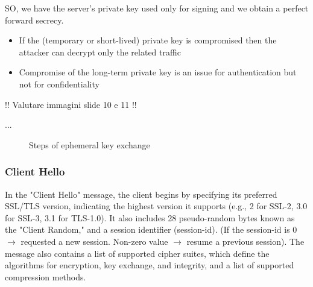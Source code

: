 SO, we have the server’s private key used only for signing and we obtain
a perfect forward secrecy. \\
\begin{itemize}[itemsep=0pt]
    \item  If the (temporary or short-lived) private key is compromised
          then the attacker can decrypt only the related traffic
    \item Compromise of the long-term private key is an issue for
          authentication but not for confidentiality
\end{itemize}

!! Valutare immagini slide 10 e 11 !!

...

\begin{figure}[h!]
    \centering
    \hfill
    \caption{Steps of ephemeral key exchange}
    \label{fig:two_images}
\end{figure}

\subsubsection{Client Hello}

In the "Client Hello" message, the client begins by specifying its preferred SSL/TLS version, indicating the highest version it supports (e.g., 2 for SSL-2, 3.0 for SSL-3, 3.1 for TLS-1.0). It also includes 28 pseudo-random bytes known as the "Client Random," and a session identifier (session-id). (If the session-id is 0 $\rightarrow$ requested a new session. Non-zero value $\rightarrow$ resume a previous session). The message also contains a list of supported cipher suites, which define the algorithms for encryption, key exchange, and integrity, and a list of supported compression methods.

